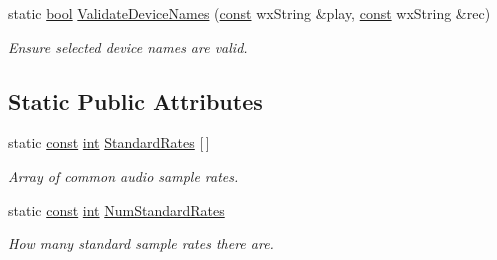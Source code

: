 \begin{DoxyCompactItemize}
static \hyperlink{mac_2config_2i386_2lib-src_2libsoxr_2soxr-config_8h_abb452686968e48b67397da5f97445f5b}{bool} \hyperlink{class_audio_i_o_acfaf9b48ca72d2d34ebfb8873e0ae7dd}{Validate\+Device\+Names} (\hyperlink{getopt1_8c_a2c212835823e3c54a8ab6d95c652660e}{const} wx\+String \&play, \hyperlink{getopt1_8c_a2c212835823e3c54a8ab6d95c652660e}{const} wx\+String \&rec)
\begin{DoxyCompactList}\small\item\em Ensure selected device names are valid. \end{DoxyCompactList}\end{DoxyCompactItemize}
\subsection*{Static Public Attributes}
\begin{DoxyCompactItemize}
\item 
static \hyperlink{getopt1_8c_a2c212835823e3c54a8ab6d95c652660e}{const} \hyperlink{xmltok_8h_a5a0d4a5641ce434f1d23533f2b2e6653}{int} \hyperlink{class_audio_i_o_a42f4cf4090548388aa1c762bb59778ba}{Standard\+Rates} \mbox{[}$\,$\mbox{]}
\begin{DoxyCompactList}\small\item\em Array of common audio sample rates. \end{DoxyCompactList}\item 
static \hyperlink{getopt1_8c_a2c212835823e3c54a8ab6d95c652660e}{const} \hyperlink{xmltok_8h_a5a0d4a5641ce434f1d23533f2b2e6653}{int} \hyperlink{class_audio_i_o_a4d794f0244d6be2f833a6627cbfcdae8}{Num\+Standard\+Rates}
\begin{DoxyCompactList}\small\item\em How many standard sample rates there are. \end{DoxyCompactList}\end{DoxyCompactItemize}
